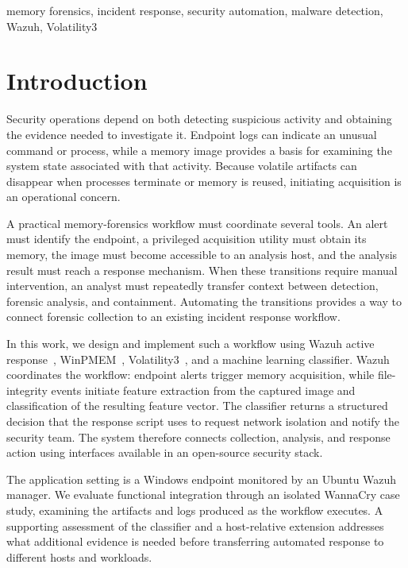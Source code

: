 \documentclass[conference]{IEEEtran}
\begin{document}
\begin{IEEEkeywords}
memory forensics, incident response, security automation, malware detection, Wazuh, Volatility3
\end{IEEEkeywords}

\section{Introduction}

Security operations depend on both detecting suspicious activity and obtaining the evidence needed to investigate it. Endpoint logs can indicate an unusual command or process, while a memory image provides a basis for examining the system state associated with that activity. Because volatile artifacts can disappear when processes terminate or memory is reused, initiating acquisition is an operational concern.

A practical memory-forensics workflow must coordinate several tools. An alert must identify the endpoint, a privileged acquisition utility must obtain its memory, the image must become accessible to an analysis host, and the analysis result must reach a response mechanism. When these transitions require manual intervention, an analyst must repeatedly transfer context between detection, forensic analysis, and containment. Automating the transitions provides a way to connect forensic collection to an existing incident response workflow.

In this work, we design and implement such a workflow using Wazuh active response~\cite{wazuh}, WinPMEM~\cite{winpmem}, Volatility3~\cite{volatility}, and a machine learning classifier. Wazuh coordinates the workflow: endpoint alerts trigger memory acquisition, while file-integrity events initiate feature extraction from the captured image and classification of the resulting feature vector. The classifier returns a structured decision that the response script uses to request network isolation and notify the security team. The system therefore connects collection, analysis, and response action using interfaces available in an open-source security stack.

The application setting is a Windows endpoint monitored by an Ubuntu Wazuh manager. We evaluate functional integration through an isolated WannaCry case study, examining the artifacts and logs produced as the workflow executes. A supporting assessment of the classifier and a host-relative extension addresses what additional evidence is needed before transferring automated response to different hosts and workloads.
\end{document}
